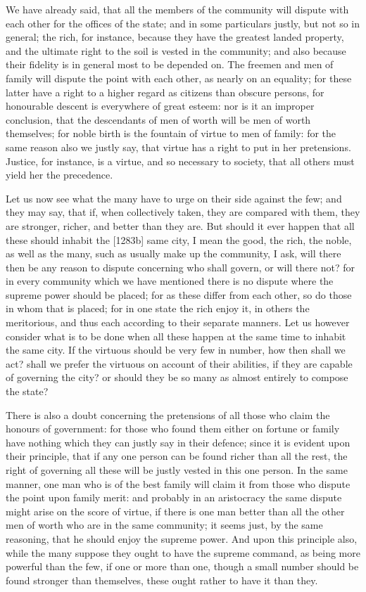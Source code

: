 We have already said, that all the members of the community will dispute
with each other for the offices of the state; and in some particulars
justly, but not so in general; the rich, for instance, because they have
the greatest landed property, and the ultimate right to the soil is vested
in the community; and also because their fidelity is in general most to be
depended on. The freemen and men of family will dispute the point with
each other, as nearly on an equality; for these latter have a right to a
higher regard as citizens than obscure persons, for honourable descent is
everywhere of great esteem: nor is it an improper conclusion, that the
descendants of men of worth will be men of worth themselves; for noble
birth is the fountain of virtue to men of family: for the same reason also
we justly say, that virtue has a right to put in her pretensions. Justice,
for instance, is a virtue, and so necessary to society, that all others
must yield her the precedence.

Let us now see what the many have to urge on their side against the few;
and they may say, that if, when collectively taken, they are compared with
them, they are stronger, richer, and better than they are. But should it
ever happen that all these should inhabit the [1283b] same city, I mean
the good, the rich, the noble, as well as the many, such as usually make
up the community, I ask, will there then be any reason to dispute
concerning who shall govern, or will there not? for in every community
which we have mentioned there is no dispute where the supreme power should
be placed; for as these differ from each other, so do those in whom that
is placed; for in one state the rich enjoy it, in others the meritorious,
and thus each according to their separate manners. Let us however consider
what is to be done when all these happen at the same time to inhabit the
same city. If the virtuous should be very few in number, how then shall we
act? shall we prefer the virtuous on account of their abilities, if they
are capable of governing the city? or should they be so many as almost
entirely to compose the state?

There is also a doubt concerning the pretensions of all those who claim
the honours of government: for those who found them either on fortune or
family have nothing which they can justly say in their defence; since it
is evident upon their principle, that if any one person can be found
richer than all the rest, the right of governing all these will be justly
vested in this one person. In the same manner, one man who is of the best
family will claim it from those who dispute the point upon family merit:
and probably in an aristocracy the same dispute might arise on the score
of virtue, if there is one man better than all the other men of worth who
are in the same community; it seems just, by the same reasoning, that he
should enjoy the supreme power. And upon this principle also, while the
many suppose they ought to have the supreme command, as being more
powerful than the few, if one or more than one, though a small number
should be found stronger than themselves, these ought rather to have it
than they.

